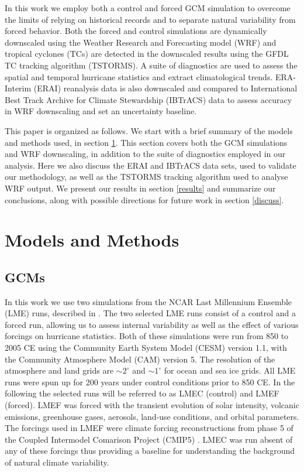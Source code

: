 \par
In this work we employ both a control and forced GCM simulation to overcome the limits of relying on historical records and to separate natural variability from forced behavior. Both the forced and control simulations are dynamically downscaled using the Weather Research and Forecasting model (WRF) and tropical cyclones (TCs) are detected in the downscaled results using the GFDL TC tracking algorithm (TSTORMS). A suite of diagnostics are used to assess the spatial and temporal hurricane statistics and extract climatological trends. ERA-Interim (ERAI) reanalysis data is also downscaled and compared to International Best Track Archive for Climate Stewardship (IBTrACS) data to assess accuracy in WRF downscaling and set an uncertainty baseline.  
\par
This paper is organized as follows. We start with a brief summary of the models and methods used, in section \ref{methods}. This section covers both the GCM simulations and WRF downscaling, in addition to the suite of diagnostics employed in our analysis. Here we also discuss the ERAI and IBTrACS data sets, used to validate our methodology, as well as the TSTORMS tracking algorithm used to analyse WRF output. We present our results in section \ref{results} and summarize our conclusions, along with possible directions for future work in section \ref{discuss}.     

\section{Models and Methods}
\label{methods}
\subsection{GCMs}
In this work we use two simulations from the NCAR Last Millennium Ensemble (LME) runs, described in \cite{gcm_lme}. The two selected LME runs consist of a control and a forced run, allowing us to assess internal variability as well as the effect of various forcings on hurricane statistics. Both of these simulations were run from 850 to 2005 CE using the Community Earth System Model (CESM) version 1.1, with the Community Atmosphere Model (CAM) version 5. The resolution of the atmosphere and land grids are $\sim2^\circ$ and $\sim1^\circ$ for ocean and sea ice grids. All LME runs were spun up for 200 years under control conditions prior to 850 CE. In the following the selected runs will be referred to as LMEC (control) and LMEF (forced). LMEF was forced with the transient evolution of solar intensity, volcanic emissions, greenhouse gases, aerosols, land-use conditions, and orbital parameters. The forcings used in LMEF were climate forcing reconstructions from phase 5 of the Coupled Intermodel Comarison Project (CMIP5) \cite{gmd-4-33-2011}. LMEC was run absent of any of these forcings thus providing a baseline for understanding the background of natural climate variability. 

